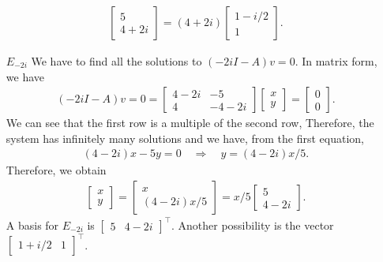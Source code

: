 \documentclass[12pt]{article}
\newcommand{\Ra}{\Rightarrow}
\begin{document}
\begin{enumerate}
		\begin{align*}
		\begin{bmatrix}
		5 \\ 4 + 2i
		\end{bmatrix}
		= (4 + 2i) \begin{bmatrix} 1 - i/2 \\ 1 \end{bmatrix} .
		\end{align*}
	\item[\underline{$E_{-2i}$}] We have to find all the solutions to $(-2iI - A)v = 0$. In matrix form, we have
		\begin{align*}
		(-2iI - A)v = 0 = \begin{bmatrix}
		4 - 2i & -5 \\
		4 & -4 - 2i
		\end{bmatrix} \begin{bmatrix}
		x \\ y
		\end{bmatrix} = \begin{bmatrix}
		0 \\ 0
		\end{bmatrix} .
		\end{align*}
	We can see that the first row is a multiple of the second row, Therefore, the system has infinitely many solutions and we have, from the first equation,
		\begin{align*}
		(4-2i)x - 5y = 0 \quad \Ra \quad y = (4 - 2i)x/5 .
		\end{align*}
	Therefore, we obtain 
		\begin{align*}
		\begin{bmatrix}
		x \\ y
		\end{bmatrix} = \begin{bmatrix}
		x \\ (4-2i)x/5
		\end{bmatrix} = x/5 \begin{bmatrix}
		5 \\ 4 - 2i
		\end{bmatrix} .
		\end{align*}
	A basis for $E_{-2i}$ is $\begin{bmatrix} 5 & 4 - 2i \end{bmatrix}^{\top}$. Another possibility is the vector $\begin{bmatrix} 1 + i/2 & 1 \end{bmatrix}^{\top}$.
	\end{enumerate}
	
\end{document}
